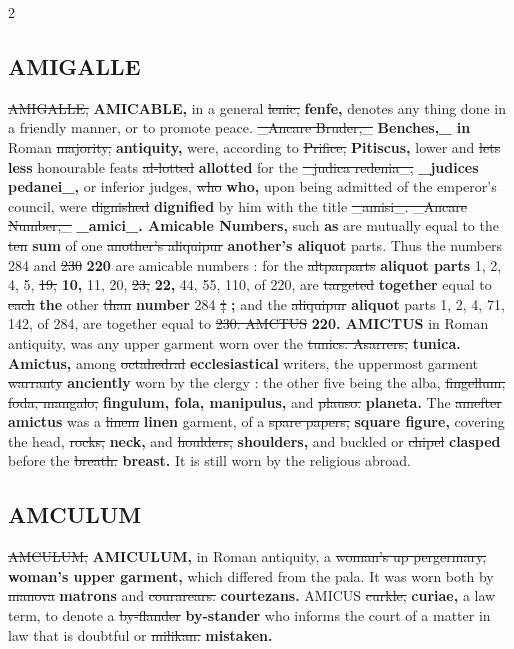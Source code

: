 \documentclass[10pt]{article}
\begin{document}
\begin{multicols}{2}
\subsection*{AMIGALLE}
\sout{AMIGALLE,} \textbf{AMICABLE,} in a general \sout{lenic,} \textbf{fenfe,} denotes any thing done in a friendly manner, or to promote peace. \sout{\_Ancare Bruder,\_} \textbf{Benches,\_ in} Roman \sout{majority,} \textbf{antiquity,} were, according to \sout{Prifice,} \textbf{Pitiscus,} lower and \sout{lets} \textbf{less} honourable feats \sout{al-lotted} \textbf{allotted} for the \sout{\_judica redenia\_,} \textbf{\_judices pedanei\_,} or inferior judges, \sout{who} \textbf{who,} upon being admitted of the emperor's council, were \sout{dignished} \textbf{dignified} by him with the title \sout{\_amisi\_. \_Ancare Number,\_} \textbf{\_amici\_. Amicable Numbers,} such \textbf{as} are mutually equal to the \sout{ten} \textbf{sum} of one \sout{another’s aliquipur} \textbf{another's aliquot} parts. Thus the numbers 284 and \sout{230} \textbf{220} are amicable numbers : for the \sout{altparparts} \textbf{aliquot parts} 1, 2, 4, 5, \sout{19,} \textbf{10,} 11, 20, \sout{23,} \textbf{22,} 44, 55, 110, of 220, are \sout{targeted} \textbf{together} equal to \sout{each} \textbf{the} other \sout{than} \textbf{number} 284 \sout{‡} \textbf{;} and the \sout{aliquipur} \textbf{aliquot} parts 1, 2, 4, 71, 142, of 284, are together equal to \sout{230. AMCTUS} \textbf{220. AMICTUS} in Roman antiquity, was any upper garment worn over the \sout{tunics. Asarrers,} \textbf{tunica. Amictus,} among \sout{octahedral} \textbf{ecclesiastical} writers, the uppermost garment \sout{warranty} \textbf{anciently} worn by the clergy : the other five being the alba, \sout{fingellum, foda, mangalo,} \textbf{fingulum, fola, manipulus,} and \sout{plauso.} \textbf{planeta.} The \sout{amefter} \textbf{amictus} was a \sout{linem} \textbf{linen} garment, of a \sout{spare papers,} \textbf{square figure,} covering the head, \sout{rocks,} \textbf{neck,} and \sout{houlders,} \textbf{shoulders,} and buckled or \sout{chipel} \textbf{clasped} before the \sout{breath.} \textbf{breast.} It is still worn by the religious abroad.

\subsection*{AMCULUM}
\sout{AMCULUM,} \textbf{AMICULUM,} in Roman antiquity, a \sout{woman’s up pergermary,} \textbf{woman's upper garment,} which differed from the pala. It was worn both by \sout{manova} \textbf{matrons} and \sout{courarears.} \textbf{courtezans.} AMICUS \sout{curkle,} \textbf{curiae,} a law term, to denote a \sout{by-flander} \textbf{by-stander} who informs the court of a matter in law that is doubtful or \sout{milikan.} \textbf{mistaken.}


\end{multicols}
\end{document}
